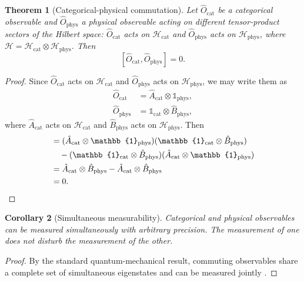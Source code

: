 \documentclass[11pt,twocolumn,a4paper]{article}
\newtheorem{theorem}{Theorem}
\newtheorem{corollary}[theorem]{Corollary}
\newcommand{\Ocat}{\hat{O}_{\mathrm{cat}}}
\newcommand{\Ophys}{\hat{O}_{\mathrm{phys}}}
\newcommand{\hilbert}{\mathcal{H}}
\begin{document}
\begin{theorem}[Categorical-physical commutation]\label{thm:commutation}
Let $\Ocat$ be a categorical observable and $\Ophys$ a physical observable acting on different tensor-product sectors of the Hilbert space: $\Ocat$ acts on $\hilbert_{\mathrm{cat}}$ and $\Ophys$ acts on $\hilbert_{\mathrm{phys}}$, where $\hilbert = \hilbert_{\mathrm{cat}} \otimes \hilbert_{\mathrm{phys}}$.
Then
\begin{equation}\label{eq:commutation}
[\Ocat, \Ophys] = 0.
\end{equation}
\end{theorem}
\begin{proof}
Since $\Ocat$ acts on $\hilbert_{\mathrm{cat}}$ and $\Ophys$ acts on $\hilbert_{\mathrm{phys}}$, we may write them as
\begin{align}
\Ocat &= \hat{A}_{\mathrm{cat}} \otimes \mathbb{1}_{\mathrm{phys}}, \\
\Ophys &= \mathbb{1}_{\mathrm{cat}} \otimes \hat{B}_{\mathrm{phys}},
\end{align}
where $\hat{A}_{\mathrm{cat}}$ acts on $\hilbert_{\mathrm{cat}}$ and $\hat{B}_{\mathrm{phys}}$ acts on $\hilbert_{\mathrm{phys}}$.
Then
\begin{align}
[\Ocat, \Ophys] &= (\hat{A}_{\mathrm{cat}} \otimes \mathbb{1}_{\mathrm{phys}})(\mathbb{1}_{\mathrm{cat}} \otimes \hat{B}_{\mathrm{phys}}) \notag \\
&\quad - (\mathbb{1}_{\mathrm{cat}} \otimes \hat{B}_{\mathrm{phys}})(\hat{A}_{\mathrm{cat}} \otimes \mathbb{1}_{\mathrm{phys}}) \\
&= \hat{A}_{\mathrm{cat}} \otimes \hat{B}_{\mathrm{phys}} - \hat{A}_{\mathrm{cat}} \otimes \hat{B}_{\mathrm{phys}} \\
&= 0.
\end{align}
\end{proof}

\begin{corollary}[Simultaneous measurability]\label{cor:simultaneous}
Categorical and physical observables can be measured simultaneously with arbitrary precision.
The measurement of one does not disturb the measurement of the other.
\end{corollary}
\begin{proof}
By the standard quantum-mechanical result, commuting observables share a complete set of simultaneous eigenstates and can be measured jointly \citep{Sakurai2020,vonNeumann1932}.
\end{proof}
\end{document}
